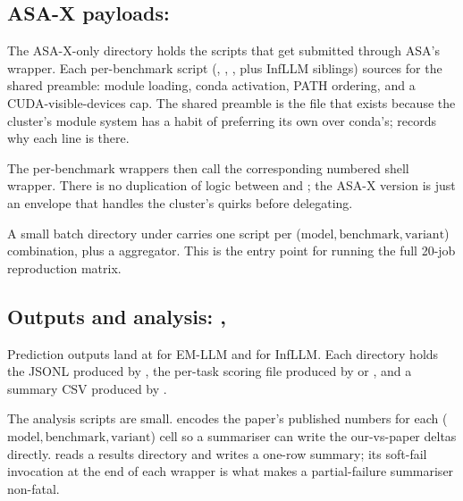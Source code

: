 \subsection{ASA-X payloads: }
\label{sec:repro-asax}

The ASA-X-only directory holds the scripts that get submitted through ASA's  wrapper. Each per-benchmark script (, , , plus InfLLM siblings) sources  for the shared preamble: module loading, conda activation, PATH ordering, and a CUDA-visible-devices cap. The shared preamble is the file that exists because the cluster's module system has a habit of preferring its own  over conda's;  records why each line is there.

The per-benchmark wrappers then call the corresponding numbered shell wrapper. There is no duplication of logic between  and ; the ASA-X version is just an envelope that handles the cluster's quirks before delegating.

A small batch directory under  carries one script per ($\text{model}, \text{benchmark}, \text{variant}$) combination, plus a  aggregator. This is the entry point for running the full 20-job reproduction matrix.

\subsection{Outputs and analysis: , }
\label{sec:repro-outputs}

Prediction outputs land at  for EM-LLM and  for InfLLM. Each directory holds the JSONL produced by , the per-task scoring file produced by  or , and a summary CSV produced by .

The analysis scripts are small.  encodes the paper's published numbers for each ($\text{model}, \text{benchmark}, \text{variant}$) cell so a summariser can write the our-vs-paper deltas directly.  reads a results directory and writes a one-row summary; its soft-fail invocation at the end of each wrapper is what makes a partial-failure summariser non-fatal.

